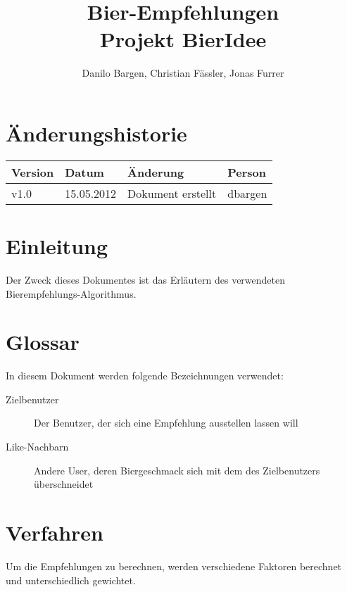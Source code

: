 \documentclass[10pt,a4paper]{scrartcl}
\author{Danilo Bargen, Christian Fässler, Jonas Furrer}
\title{Bier-Empfehlungen\\ Projekt BierIdee}
\begin{document}
\begin{titlepage}
	\maketitle
	\vspace{120mm}
	\thispagestyle{empty} %
\end{titlepage}

\tableofcontents
\newpage

\section*{Änderungshistorie}
\begin{tabular}{p{}p{}p{}p{}}
\toprule
\textbf{Version} & \textbf{Datum} & \textbf{Änderung} & \textbf{Person} \\  
\midrule
v1.0 & 15.05.2012 & Dokument erstellt & dbargen \\  
\bottomrule
\end{tabular} 
\newpage


\section{Einleitung}

Der Zweck dieses Dokumentes ist das Erläutern des verwendeten Bierempfehlungs-Algorithmus.


\section{Glossar}

In diesem Dokument werden folgende Bezeichnungen verwendet:

\begin{description}
	\item[Zielbenutzer] Der Benutzer, der sich eine Empfehlung ausstellen lassen will
	\item[Like-Nachbarn] Andere User, deren Biergeschmack sich mit dem des Zielbenutzers überschneidet
\end{description}


\section{Verfahren}

Um die Empfehlungen zu berechnen, werden verschiedene Faktoren berechnet und unterschiedlich
gewichtet.
\end{document}

